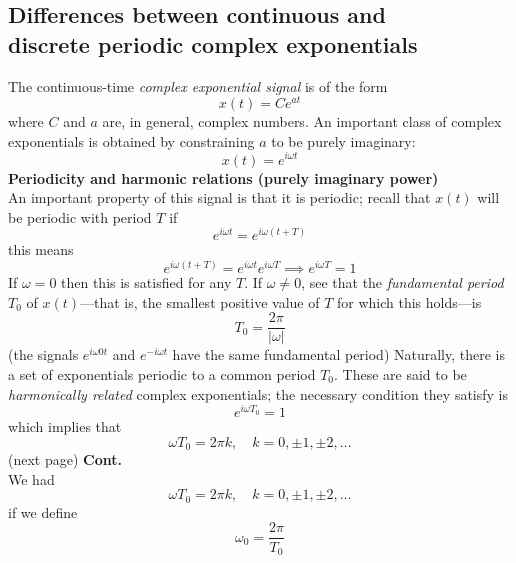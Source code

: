 \documentclass{report}
\begin{document}
\subsection{Differences between continuous and\\discrete periodic complex exponentials}
The continuous-time \textit{complex exponential signal} is of the form
\begin{equation*}
x(t)=Ce^{at}
\end{equation*}
where $C$ and $a$ are, in general, complex numbers. An important class of complex exponentials is obtained by constraining $a$ to be purely imaginary:
\begin{equation*}
x(t)=e^{i\omega t}
\end{equation*}
\textbf{Periodicity and harmonic relations (purely imaginary power)}\\
An important property of this signal is that it is periodic; recall that $x(t)$ will be periodic with period $T$ if
\begin{equation*}
e^{i\omega t}=e^{i\omega(t+T)}
\end{equation*}
this means
\begin{equation*}
e^{i\omega(t+T)}=e^{i\omega t}e^{i\omega T}\implies
e^{i\omega T}=1
\end{equation*}
If $\omega=0$ then this is satisfied for any $T$. If $\omega\neq0$, see that the \textit{fundamental period} 
$T_0$ of $x(t)$---that is, the smallest positive value of $T$ for which this holds---is
\begin{equation*}
T_0=\frac{2\pi}{|\omega|}
\end{equation*}
(the signals $e^{i\omega 0t}$ and $e^{-i\omega t}$ have the same fundamental period)
Naturally, there is a set of exponentials periodic to a common period $T_0$. These are said to be
\textit{harmonically related} complex exponentials; the necessary condition they satisfy is
\begin{equation*}
e^{i\omega T_0}=1
\end{equation*}
which implies that
\begin{equation*}
\omega T_0=2\pi k,\quad k=0,\pm1,\pm2,\ldots
\end{equation*}
(next page)\newpage
\noindent\textbf{Cont.}\\
We had
\begin{equation*}
\omega T_0=2\pi k,\quad k=0,\pm1,\pm2,\ldots
\end{equation*}
if we define
\begin{equation*}
\omega_0=\frac{2\pi}{T_0}
\end{equation*}
\end{document}

